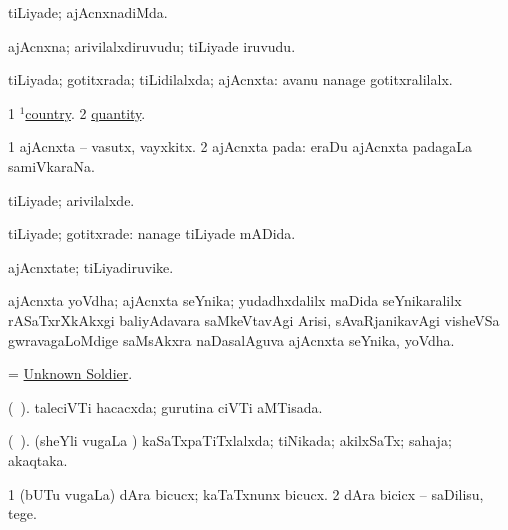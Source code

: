 \bentry
{} 
\gl{\kirxvi}
\expl{}
\bmng
tiLiyade; ajAcnxnadiMda. 
\emng
\eentry

\bentry
{} 
\gl{\nA}
\expl{}
\bmng
ajAcnxna; arivilalxdiruvudu; tiLiyade iruvudu. 
\emng
\eentry

\bentry
{} 
\gl{\gu}
\expl{}
\bmng
tiLiyada; gotitxrada; tiLidilalxda; ajAcnxta:  avanu nanage gotitxralilalx. 
\emng

\noindent
\gl{\pagu}
\expl{}
\bmng
\bnum
\num{1}  \hyperref{kandict_c.pdf}{C}{country(1) nuga(4)}{$^1$country}. 
\num{2}  \hyperref{kandict_q.pdf}{Q}{quantity pagu(2)}{quantity}. 
\enum
\emng
\eentry

\bentry
{} 
\gl{\nA}
\expl{}
\bmng
\bnum
\num{1} ajAcnxta -- vasutx, vayxkitx. 
\num{2} ajAcnxta pada:  eraDu ajAcnxta padagaLa samiVkaraNa. 
\enum
\emng
\eentry

\bentry
{} 
\gl{\kirxvi}
\expl{}
\bmng
tiLiyade; arivilalxde. 
\emng

\noindent 
\gl{\pagu}
\expl{}
\bmng
{} tiLiyade; gotitxrade:  nanage tiLiyade mADida. 
\emng
\eentry

\bentry
{} 
\gl{\nA}
\expl{}
\bmng
ajAcnxtate; tiLiyadiruvike. 
\emng
\eentry

\bentry
{}
\gl{\nA}
\expl{}
\bmng
ajAcnxta yoVdha; ajAcnxta seYnika; yudadhxdalilx maDida seYnikaralilx rASaTxrXkAkxgi baliyAdavara saMkeVtavAgi Arisi, sAvaRjanikavAgi visheVSa gwravagaLoMdige saMsAkxra naDasalAguva ajAcnxta seYnika, yoVdha. 
\emng
\eentry

\bentry
{}
\gl{\nA}
\expl{}
\bmng
= \hyperlink{Unknown Soldier}{Unknown Soldier}. 
\emng
\eentry

\bentry
{} 
\gl{\gu}
\expl{}
\bmng
(\ame\ ). taleciVTi hacacxda; gurutina ciVTi aMTisada. 
\emng
\eentry

\bentry
{} 
\gl{\gu}
\expl{}
\bmng
(\ame\ ). (sheYli \mo vugaLa \vi) kaSaTxpaTiTxlalxda; tiNikada; akilxSaTx; sahaja; akaqtaka. 
\emng
\eentry

\bentry
{} 
\gl{\sakirx}
\expl{}
\bmng
\bnum
\num{1} (bUTu \mo vugaLa) dAra bicucx; kaTaTxnunx bicucx. 
\num{2} dAra bicicx -- saDilisu, tege. 
\enum
\emng
\eentry

